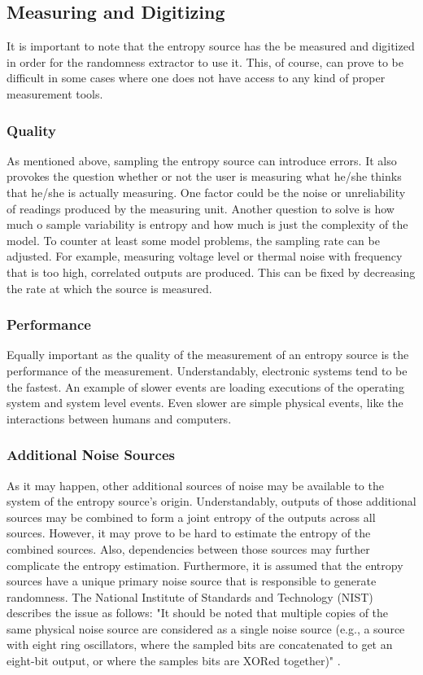 \subsection{Measuring and Digitizing}
It is important to note that the entropy source has the be measured and digitized in order for the randomness extractor to use it.
This, of course, can prove to be difficult in some cases where one does not have access to any kind of proper measurement tools.

\subsubsection{Quality}
As mentioned above, sampling the entropy source can introduce errors. It also provokes the question whether or not the user is measuring what he/she thinks that he/she is actually measuring.
One factor could be the noise or unreliability of readings produced by the measuring unit. Another question to solve is how much o sample variability is entropy and how much is just the complexity of the model.
\newline
To counter at least some model problems, the sampling rate can be adjusted. For example, measuring voltage level or thermal noise with frequency that is too high, correlated outputs are produced.
This can be fixed by decreasing the rate at which the source is measured.

\subsubsection{Performance}
Equally important as the quality of the measurement of an entropy source is the performance of the measurement. Understandably, electronic systems tend to be the fastest. An example of slower events are loading executions of the operating system and system level events.
Even slower are simple physical events, like the interactions between humans and computers.

\subsubsection{Additional Noise Sources}
As it may happen, other additional sources of noise may be available to the system of the entropy source's origin.
Understandably, outputs of those additional sources may be combined to form a joint entropy of the outputs across all sources.
However, it may prove to be hard to estimate the entropy of the combined sources. Also, dependencies between those sources may further complicate the entropy estimation.
\newline
Furthermore, it is assumed that the entropy sources have a unique primary noise source that is responsible to generate randomness. 
The National Institute of Standards and Technology (NIST) describes the issue as follows: "It should be noted that multiple copies of the same physical noise source are considered as a single noise source (e.g., a source with eight ring
oscillators, where the sampled bits are concatenated to get an eight-bit output, or where the samples bits are XORed together)" \cite{randomness:sources1}.

